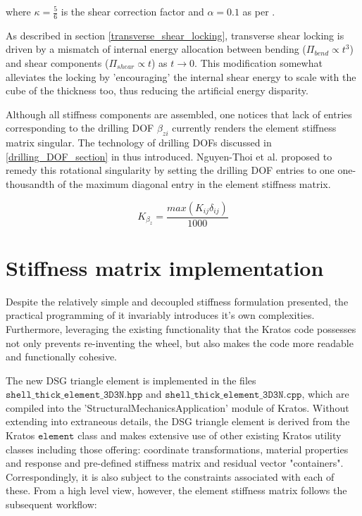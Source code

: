 where $\kappa = \frac{5}{6}$ is the shear correction factor and $\alpha = 0.1$ as per \cite{Lyl93}.

As described in section \ref{transverse_shear_locking}, transverse shear locking is driven by a mismatch of internal energy allocation between bending ($\Pi_{bend} \propto t^3$) and shear components ($\Pi_{shear} \propto t$) as $t \rightarrow 0$.  This modification somewhat alleviates the locking by 'encouraging' the internal shear energy to scale with the cube of the thickness too, thus reducing the artificial energy disparity.

Although all stiffness components are assembled, one notices that lack of entries corresponding to the drilling DOF $\beta_{zi}$ currently renders the element stiffness matrix singular. The technology of drilling DOFs discussed in \ref{drilling_DOF_section} in thus introduced. Nguyen-Thoi et al. \cite{Ngu13} proposed to remedy this rotational singularity by setting the drilling DOF entries to one one-thousandth of the maximum diagonal entry in the element stiffness matrix.

\begin{equation} 
K_{\beta_z} =  \frac{max(K_{ij}\delta_{ij})}{1000}
\label{eqtdrilling}
\end{equation}




\section{Stiffness matrix implementation}
Despite the relatively simple and decoupled stiffness formulation presented, the practical programming of it invariably introduces it's own complexities. Furthermore, leveraging the existing functionality that the Kratos code possesses not only prevents re-inventing the wheel, but also makes the code more readable and functionally cohesive.  

The new DSG triangle element is implemented in the files $\texttt{shell\_thick\_element\_3D3N.hpp}$ and $\texttt{shell\_thick\_element\_3D3N.cpp}$, which are compiled into the  'StructuralMechanicsApplication' module of Kratos. Without extending into extraneous details, the DSG triangle element is derived from the Kratos $\texttt{element}$ class and makes extensive use of other existing Kratos utility classes including those offering: coordinate transformations, material properties and response and pre-defined stiffness matrix and residual vector "containers". Correspondingly, it is also subject to the constraints associated with each of these. From a high level view, however, the element stiffness matrix follows the subsequent workflow:

